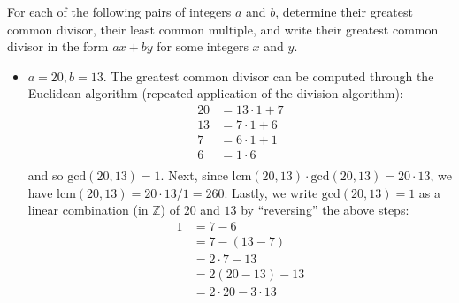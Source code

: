 \documentclass[12pt]{article}
\newenvironment{problem}[2][Exercise]{\begin{trivlist}
\item[\hskip \labelsep {\bfseries #1}\hskip \labelsep {\bfseries #2.}]}{\end{trivlist}}
\begin{document}
\begin{problem}{0.2.1}
For each of the following pairs of integers $a$ and $b$, determine their greatest common divisor, their least common multiple, and write their greatest common divisor in the form $ax+by$ for some integers $x$ and $y$.
\begin{itemize}
    \item $a=20,b=13$. The greatest common divisor can be computed through the Euclidean algorithm (repeated application of the division algorithm):
    \begin{equation*}
    \begin{split}
    20 & = 13 \cdot 1 + 7 \\
    13 & = 7 \cdot 1 + 6 \\
    7 & = 6 \cdot 1 + 1 \\
    6 & = 1\cdot 6 \\
    \end{split}
    \end{equation*} and so $\text{gcd}\left(20,13\right) = 1$. Next, since $ \text{lcm}\left(20,13\right) \cdot \text{gcd}\left(20,13\right) = 20\cdot 13$, we have $\text{lcm}\left(20,13\right) = 20\cdot 13 / 1 = 260$. Lastly, we write $\text{gcd}\left(20,13\right)=1$ as a linear combination (in $\mathbb{Z}$) of $20$ and $13$ by ``reversing'' the above steps: 
    \begin{equation*}
    \begin{split}
    	1 & = 7 - 6 \\
    	& = 7 - \left(13-7\right) \\
    	& = 2\cdot 7 - 13 \\
    	& = 2 \left(20-13\right) - 13 \\
    	& = 2\cdot 20 - 3\cdot 13
    \end{split}
    \end{equation*}
    

\end{itemize}
\end{problem}
\end{document}

